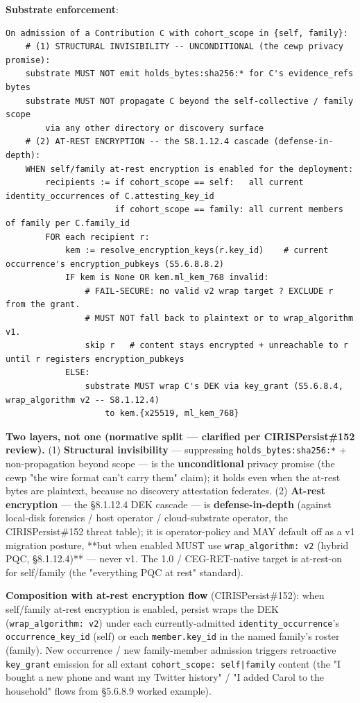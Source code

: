 \documentclass[11pt]{article}
\begin{document}
\textbf{Substrate enforcement}:


\begin{lstlisting}
On admission of a Contribution C with cohort_scope in {self, family}:
    # (1) STRUCTURAL INVISIBILITY -- UNCONDITIONAL (the cewp privacy promise):
    substrate MUST NOT emit holds_bytes:sha256:* for C's evidence_refs bytes
    substrate MUST NOT propagate C beyond the self-collective / family scope
        via any other directory or discovery surface
    # (2) AT-REST ENCRYPTION -- the S8.1.12.4 cascade (defense-in-depth):
    WHEN self/family at-rest encryption is enabled for the deployment:
        recipients := if cohort_scope == self:   all current identity_occurrences of C.attesting_key_id
                      if cohort_scope == family: all current members of family per C.family_id
        FOR each recipient r:
            kem := resolve_encryption_keys(r.key_id)    # current occurrence's encryption_pubkeys (S5.6.8.8.2)
            IF kem is None OR kem.ml_kem_768 invalid:
                # FAIL-SECURE: no valid v2 wrap target ? EXCLUDE r from the grant.
                # MUST NOT fall back to plaintext or to wrap_algorithm v1.
                skip r   # content stays encrypted + unreachable to r until r registers encryption_pubkeys
            ELSE:
                substrate MUST wrap C's DEK via key_grant (S5.6.8.4, wrap_algorithm v2 -- S8.1.12.4)
                    to kem.{x25519, ml_kem_768}
\end{lstlisting}

\textbf{Two layers, not one (normative split — clarified per CIRISPersist\#152 review).} (1) \textbf{Structural invisibility} — suppressing \texttt{holds\_bytes:sha256:*} + non-propagation beyond scope — is the \textbf{unconditional} privacy promise (the cewp "the wire format can't carry them" claim); it holds even when the at-rest bytes are plaintext, because no discovery attestation federates. (2) \textbf{At-rest encryption} — the §8.1.12.4 DEK cascade — is \textbf{defense-in-depth} (against local-disk forensics / host operator / cloud-substrate operator, the CIRISPersist\#152 threat table); it is operator-policy and MAY default off as a v1 migration posture, **but when enabled MUST use \texttt{wrap\_algorithm: v2} (hybrid PQC, §8.1.12.4)** — never v1. The 1.0 / CEG-RET-native target is at-rest-on for self/family (the "everything PQC at rest" standard).


\textbf{Composition with at-rest encryption flow} (CIRISPersist\#152): when self/family at-rest encryption is enabled, persist wraps the DEK (\texttt{wrap\_algorithm: v2}) under each currently-admitted \texttt{identity\_occurrence}'s \texttt{occurrence\_key\_id} (self) or each \texttt{member.key\_id} in the named family's roster (family). New occurrence / new family-member admission triggers retroactive \texttt{key\_grant} emission for all extant \texttt{cohort\_scope: self|family} content (the "I bought a new phone and want my Twitter history" / "I added Carol to the household" flows from §5.6.8.9 worked example).
\end{document}
